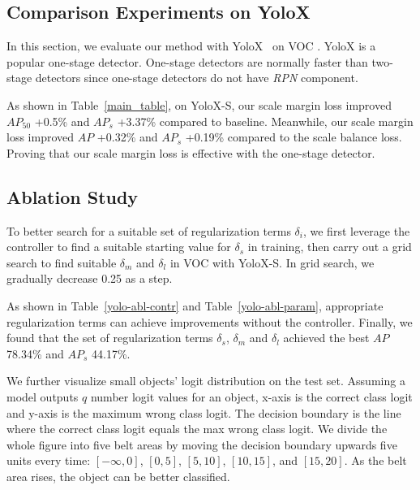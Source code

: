 \documentclass{article}
\begin{document}
\subsection{Comparison Experiments on YoloX}
\label{section_4_3}


In this section, we evaluate our method with YoloX~\cite{ge2021yolox} on VOC \cite{everingham2010pascal}. YoloX is a popular one-stage detector. One-stage detectors are normally faster than two-stage detectors since one-stage detectors do not have \textit{RPN} component.

As shown in Table~\ref{main_table}, on YoloX-S, our scale margin loss improved $AP_{50}$ +0.5\% and $AP_{s}$ +3.37\% compared to baseline. Meanwhile, our scale margin loss improved $AP$ +0.32\% and $AP_{s}$ +0.19\% compared to the scale balance loss. Proving that our scale margin loss is effective with the one-stage detector.

\subsection{Ablation Study}
\label{section_4_4}

To better search for a suitable set of regularization terms $\delta_{i}$, we first leverage the controller to find a suitable starting value for $\delta_{s}$ in training, then carry out a grid search to find suitable $\delta_{m}$ and $\delta_{l}$ in VOC with YoloX-S. In grid search, we gradually decrease 0.25 as a step.

As shown in Table~\ref{yolo-abl-contr} and Table~\ref{yolo-abl-param}, appropriate regularization terms can achieve improvements without the controller. Finally, we found that the set of regularization terms $\delta_{s}$, $\delta_{m}$ and $\delta_{l}$ achieved the best $AP$ 78.34\% and $AP_{s}$ 44.17\%.


We further visualize small objects' logit distribution on the test set. Assuming a model outputs $q$ number logit values for an object, x-axis is the correct class logit and y-axis is the maximum wrong class logit. The decision boundary is the line where the correct class logit equals the max wrong class logit. We divide the whole figure into five belt areas by moving the decision boundary upwards five units every time: $[-\infty, 0]$, $[0, 5]$, $[5, 10]$, $[10, 15]$, and $[15, 20]$. As the belt area rises, the object can be better classified.
\end{document}

